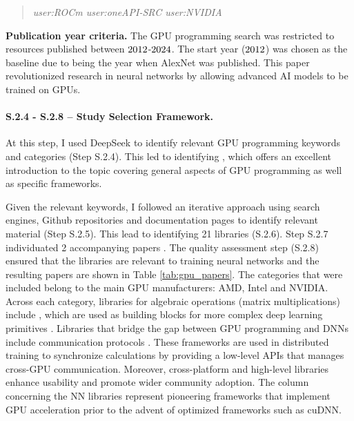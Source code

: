 \begin{quote}
	\textit{user:ROCm user:oneAPI-SRC user:NVIDIA}
\end{quote}

\textbf{Publication year criteria.}
The GPU programming search was restricted to resources published between
$2012$-$2024$. The start year ($2012$) was chosen as the baseline due
to being the year when AlexNet \cite{krizhevsky_imagenet_2012} was published. This paper
revolutionized research in neural networks by allowing advanced AI models to be trained on GPUs.

\paragraph{S.2.4 - S.2.8 -- Study Selection Framework.}
\label{sec:ai-screening}
At this step, I used DeepSeek \cite{noauthor_deepseek_nodate} to identify relevant GPU programming
keywords and categories (Step S.2.4). This led to identifying \cite{noauthor_enccsgpu-programming_nodate}, which
offers an excellent introduction to the topic covering general aspects of GPU programming as well
as specific frameworks.


Given the relevant keywords, I followed an iterative approach using search engines, Github
repositories and documentation pages to identify relevant material (Step S.2.5). This lead to
identifying 21 libraries (S.2.6). Step S.2.7 individuated 2 accompanying papers
\cite{chetlur_cudnn_2014,okuta_cupy_2017}. The quality assessment step (S.2.8) ensured that the
libraries are relevant to training neural networks and the resulting papers are shown in Table
\ref{tab:gpu_papers}. The categories that were included belong to the main GPU manufacturers: AMD,
Intel and NVIDIA. Across each category, libraries for algebraic operations (matrix multiplications)
include \cite{noauthor_cublas_nodate,noauthor_rocmrocblas_2025,
	noauthor_uxlfoundationonemath_2025}, which are used as building blocks for more complex deep
learning primitives
\cite{chetlur_cudnn_2014,noauthor_rocmmiopen_2025,onednn_contributors_oneapi_2025}. Libraries that
bridge the gap between GPU programming and DNNs include communication protocols
\cite{noauthor_nvidianccl_2025,noauthor_rocmrccl_2025,noauthor_uxlfoundationoneccl_2025}. These
frameworks are used in distributed training to synchronize calculations by providing a low-level
APIs that manages cross-GPU communication. Moreover, cross-platform and high-level libraries
enhance usability and promote wider community adoption. The column concerning the NN libraries
\cite{Jia.EtAl_2014a,krizhevsky_imagenet_2012, Goodfellow.EtAl_2013,Collobert.EtAl_} represent
pioneering frameworks that implement GPU acceleration prior to the advent of optimized frameworks
such as cuDNN.

